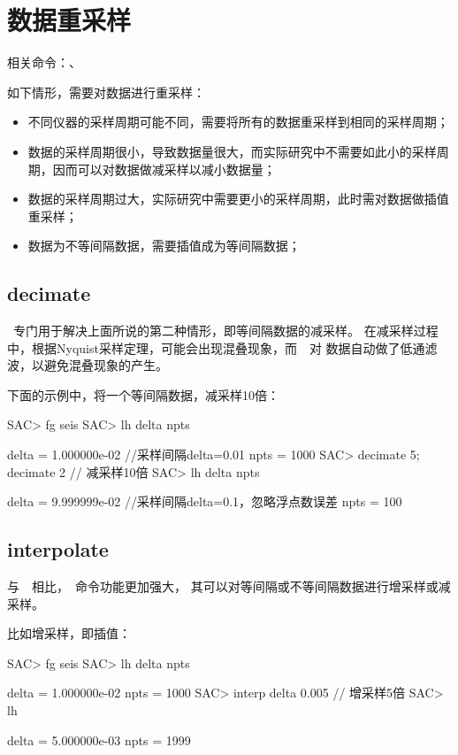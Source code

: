 \section{数据重采样}
相关命令：、

如下情形，需要对数据进行重采样：
\begin{itemize}
\item 不同仪器的采样周期可能不同，需要将所有的数据重采样到相同的采样周期；
\item 数据的采样周期很小，导致数据量很大，而实际研究中不需要如此小的采样周期，因而可以对数据做减采样以减小数据量；
\item 数据的采样周期过大，实际研究中需要更小的采样周期，此时需对数据做插值重采样；
\item 数据为不等间隔数据，需要插值成为等间隔数据；
\end{itemize}

\subsection{decimate}
~专门用于解决上面所说的第二种情形，即等间隔数据的减采样。
在减采样过程中，根据Nyquist采样定理，可能会出现混叠现象，而~~对
数据自动做了低通滤波，以避免混叠现象的产生。

下面的示例中，将一个等间隔数据，减采样10倍：
\begin{SACCode}
SAC> fg seis
SAC> lh delta npts

     delta = 1.000000e-02       //采样间隔delta=0.01
      npts = 1000
SAC> decimate 5; decimate 2     // 减采样10倍
SAC> lh delta npts

     delta = 9.999999e-02       //采样间隔delta=0.1，忽略浮点数误差
      npts = 100
\end{SACCode}

\subsection{interpolate}
与~~相比，~命令功能更加强大，
其可以对等间隔或不等间隔数据进行增采样或减采样。

比如增采样，即插值：
\begin{SACCode}
SAC> fg seis
SAC> lh delta npts

     delta = 1.000000e-02
     npts = 1000
SAC> interp delta 0.005         // 增采样5倍
SAC> lh

     delta = 5.000000e-03
     npts = 1999
\end{SACCode}

